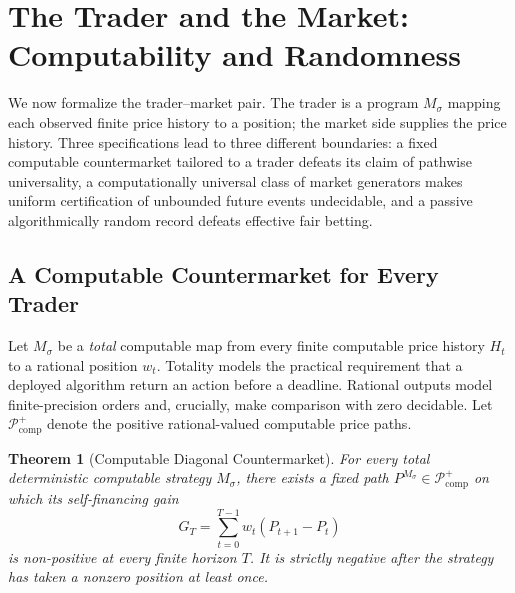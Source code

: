 \documentclass[aps,pra,reprint,superscriptaddress,amsmath,amssymb,floatfix]{revtex4-2}
\theoremstyle{plain}
\newtheorem{theorem}{Theorem}
\theoremstyle{definition}
\theoremstyle{remark}
\begin{document}
\section{The Trader and the Market: Computability and Randomness}
\label{sec:computability}

We now formalize the trader--market pair. The trader is a program
\(M_\sigma\) mapping each observed finite price history to a position; the
market side supplies the price history. Three specifications lead to three
different boundaries: a fixed computable countermarket tailored to a trader
defeats its claim of pathwise universality, a computationally universal class
of market generators makes uniform certification of unbounded future events
undecidable, and a passive algorithmically random record defeats effective
fair betting.

\subsection{A Computable Countermarket for Every Trader}

Let \(M_\sigma\) be a \emph{total} computable map from every finite computable
price history \(H_t\) to a rational position \(w_t\). Totality models the
practical requirement that a deployed algorithm return an action before a
deadline. Rational outputs model finite-precision orders and, crucially, make
comparison with zero decidable. Let \(\mathcal P_{\mathrm{comp}}^{+}\) denote
the positive rational-valued computable price paths.

\begin{samepage}
\begin{theorem}[Computable Diagonal Countermarket]
  \label{thm:counterpath}
  For every total deterministic computable strategy \(M_\sigma\), there exists
  a fixed path \(P^{M_\sigma}\in\mathcal P_{\mathrm{comp}}^{+}\) on which its
  self-financing gain
  \[
    G_T=\sum_{t=0}^{T-1}w_t(P_{t+1}-P_t)
  \]
  is non-positive at every finite horizon \(T\). It is strictly negative after
  the strategy has taken a nonzero position at least once.
\end{theorem}
\end{samepage}
\end{document}
